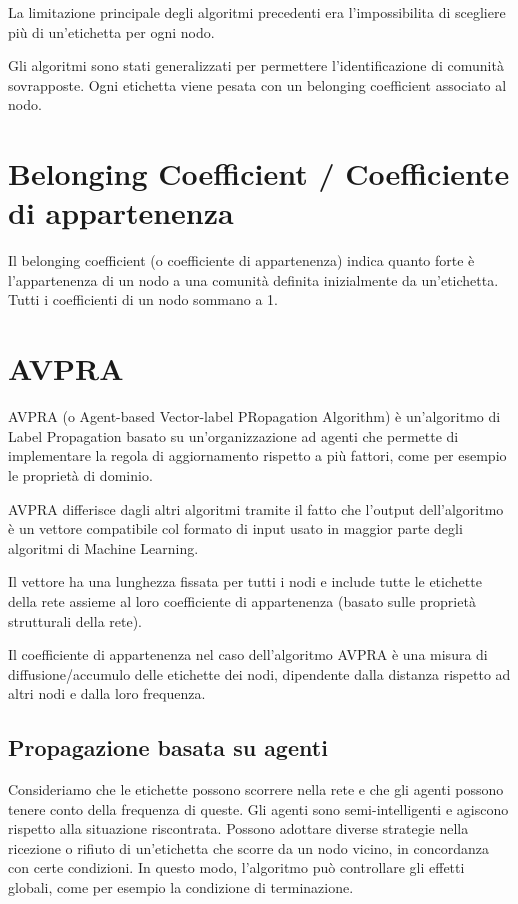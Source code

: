 \documentclass[a4paper,12pt]{report}
\begin{document}
	La limitazione principale degli algoritmi precedenti era l'impossibilita di scegliere più di un'etichetta per ogni nodo. 

	Gli algoritmi sono stati generalizzati per permettere l'identificazione di comunità sovrapposte. Ogni etichetta viene pesata con un belonging coefficient associato al nodo.  \cite{avpra}

	\section{Belonging Coefficient / Coefficiente di appartenenza}
	Il belonging coefficient (o coefficiente di appartenenza) indica quanto forte è l'appartenenza di un nodo a una comunità definita inizialmente da un'etichetta. Tutti i coefficienti di un nodo sommano a 1. \cite{gregory}

	\section{AVPRA}
	AVPRA (o Agent-based Vector-label PRopagation Algorithm) è un'algoritmo di Label Propagation basato su un'organizzazione ad agenti che permette di implementare la regola di aggiornamento rispetto a più fattori, come per esempio le proprietà di dominio. 

	AVPRA differisce dagli altri algoritmi tramite il fatto che l'output dell'algoritmo è un vettore compatibile col formato di input usato in maggior parte degli algoritmi di Machine Learning.
	
	Il vettore ha una lunghezza fissata per tutti i nodi e include tutte le etichette della rete assieme al loro coefficiente di appartenenza (basato sulle proprietà strutturali della rete).

	Il coefficiente di appartenenza nel caso dell'algoritmo AVPRA è una misura di diffusione/accumulo delle etichette dei nodi, dipendente dalla distanza rispetto ad altri nodi e dalla loro frequenza. \cite{avpra} 

		\subsection{Propagazione basata su agenti}
		Consideriamo che le etichette possono scorrere nella rete e che gli agenti possono tenere conto della frequenza di queste. Gli agenti sono semi-intelligenti e agiscono rispetto alla situazione riscontrata. Possono adottare diverse strategie nella ricezione o rifiuto di un'etichetta che scorre da un nodo vicino, in concordanza con certe condizioni. In questo modo, l'algoritmo può controllare gli effetti globali, come per esempio la condizione di terminazione. \cite{avpra}
\end{document}
